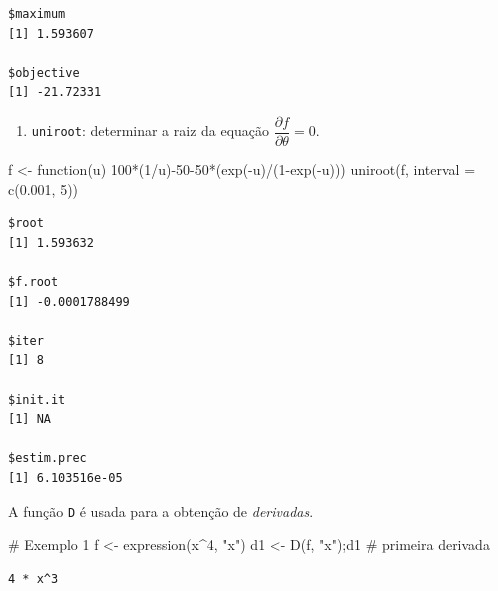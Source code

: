 \documentclass[
  letterpaper,
  DIV=11,
  numbers=noendperiod]{scrreprt}
\newenvironment{Shaded}{\begin{snugshade}}{\end{snugshade}}
\newcommand{\AttributeTok}[1]{\textcolor[rgb]{0.40,0.45,0.13}{#1}}
\newcommand{\CommentTok}[1]{\textcolor[rgb]{0.37,0.37,0.37}{#1}}
\newcommand{\ControlFlowTok}[1]{\textcolor[rgb]{0.00,0.23,0.31}{#1}}
\newcommand{\DecValTok}[1]{\textcolor[rgb]{0.68,0.00,0.00}{#1}}
\newcommand{\FloatTok}[1]{\textcolor[rgb]{0.68,0.00,0.00}{#1}}
\newcommand{\FunctionTok}[1]{\textcolor[rgb]{0.28,0.35,0.67}{#1}}
\newcommand{\NormalTok}[1]{\textcolor[rgb]{0.00,0.23,0.31}{#1}}
\newcommand{\OtherTok}[1]{\textcolor[rgb]{0.00,0.23,0.31}{#1}}
\newcommand{\SpecialCharTok}[1]{\textcolor[rgb]{0.37,0.37,0.37}{#1}}
\newcommand{\StringTok}[1]{\textcolor[rgb]{0.13,0.47,0.30}{#1}}
\providecommand{\tightlist}{%
  \setlength{\itemsep}{0pt}\setlength{\parskip}{0pt}}\usepackage{longtable,booktabs,array}
\begin{document}
\begin{verbatim}
$maximum
[1] 1.593607

$objective
[1] -21.72331
\end{verbatim}

\begin{enumerate}
\def\labelenumi{\arabic{enumi}.}
\setcounter{enumi}{1}
\tightlist
\item
  \texttt{uniroot}: determinar a raiz da equação
  \(\dfrac{\partial{f}}{\partial\theta}=0\).
\end{enumerate}

\begin{Shaded}
\begin{Highlighting}[]
\NormalTok{f }\OtherTok{\textless{}{-}} \ControlFlowTok{function}\NormalTok{(u) }\DecValTok{100}\SpecialCharTok{*}\NormalTok{(}\DecValTok{1}\SpecialCharTok{/}\NormalTok{u)}\SpecialCharTok{{-}}\DecValTok{50{-}50}\SpecialCharTok{*}\NormalTok{(}\FunctionTok{exp}\NormalTok{(}\SpecialCharTok{{-}}\NormalTok{u)}\SpecialCharTok{/}\NormalTok{(}\DecValTok{1}\SpecialCharTok{{-}}\FunctionTok{exp}\NormalTok{(}\SpecialCharTok{{-}}\NormalTok{u)))}
\FunctionTok{uniroot}\NormalTok{(f, }\AttributeTok{interval =} \FunctionTok{c}\NormalTok{(}\FloatTok{0.001}\NormalTok{, }\DecValTok{5}\NormalTok{))}
\end{Highlighting}
\end{Shaded}

\begin{verbatim}
$root
[1] 1.593632

$f.root
[1] -0.0001788499

$iter
[1] 8

$init.it
[1] NA

$estim.prec
[1] 6.103516e-05
\end{verbatim}

A função \texttt{D} é usada para a obtenção de \emph{derivadas}.

\begin{Shaded}
\begin{Highlighting}[]
\CommentTok{\# Exemplo 1}
\NormalTok{f }\OtherTok{\textless{}{-}} \FunctionTok{expression}\NormalTok{(x}\SpecialCharTok{\^{}}\DecValTok{4}\NormalTok{, }\StringTok{"x"}\NormalTok{)   }
\NormalTok{d1 }\OtherTok{\textless{}{-}} \FunctionTok{D}\NormalTok{(f, }\StringTok{"x"}\NormalTok{);d1  }\CommentTok{\# primeira derivada}
\end{Highlighting}
\end{Shaded}

\begin{verbatim}
4 * x^3
\end{verbatim}
\end{document}
